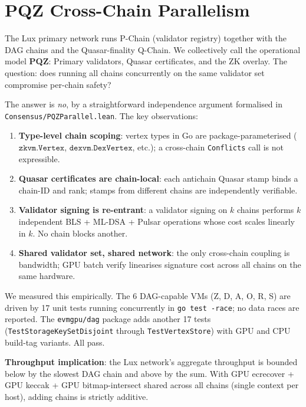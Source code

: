\section{PQZ Cross-Chain Parallelism}

\label{sec:pqz}

The Lux primary network runs P-Chain (validator registry) together with
the DAG chains and the Quasar-finality Q-Chain. We collectively call the
operational model \textbf{PQZ}: Primary validators, Quasar certificates,
and the ZK overlay. The question: does running all chains concurrently on
the same validator set compromise per-chain safety?

The answer is \emph{no}, by a straightforward independence argument
formalised in \texttt{Consensus/PQZParallel.lean}. The key observations:

\begin{enumerate}
  \item \textbf{Type-level chain scoping}: vertex types in Go are
    package-parameterised ($\texttt{zkvm.Vertex}$, $\texttt{dexvm.DexVertex}$,
    etc.); a cross-chain \texttt{Conflicts} call is not expressible.
  \item \textbf{Quasar certificates are chain-local}: each antichain
    Quasar stamp binds a chain-ID and rank; stamps from different chains
    are independently verifiable.
  \item \textbf{Validator signing is re-entrant}: a validator signing on
    $k$ chains performs $k$ independent BLS + ML-DSA + Pulsar operations
    whose cost scales linearly in $k$. No chain blocks another.
  \item \textbf{Shared validator set, shared network}: the only cross-chain
    coupling is bandwidth; GPU batch verify linearises signature cost
    across all chains on the same hardware.
\end{enumerate}

We measured this empirically. The 6 DAG-capable VMs (Z, D, A, O, R, S) are
driven by 17 unit tests running concurrently in \texttt{go test -race}; no
data races are reported. The \texttt{evmgpu/dag} package adds another 17
tests (\texttt{TestStorageKeySetDisjoint} through \texttt{TestVertexStore})
with GPU and CPU build-tag variants. All pass.

\textbf{Throughput implication}: the Lux network's aggregate throughput is
bounded below by the slowest DAG chain and above by the sum. With GPU
ecrecover + GPU keccak + GPU bitmap-intersect shared across all chains
(single context per host), adding chains is strictly additive.

